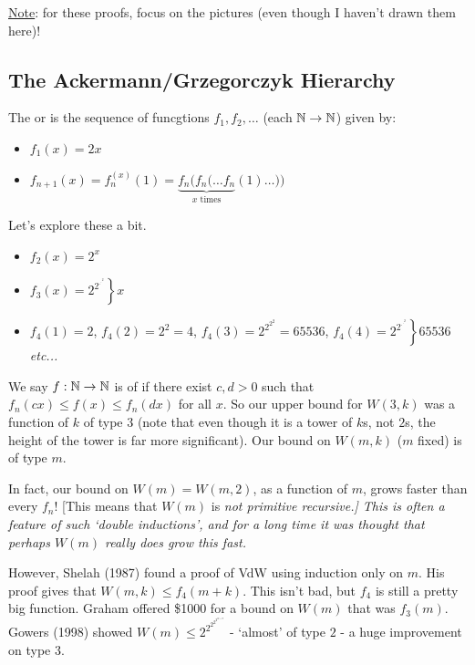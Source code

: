\documentclass[10pt]{article}
\begin{document}
\underline{Note}: for these proofs, focus on the pictures (even though I haven't drawn them here)!


\subsection*{The Ackermann/Grzegorczyk Hierarchy}

\begin{defin*} The  or   is the sequence of funcgtions $f_1,f_2,\dots$ (each $\mathbb{N}\rightarrow\mathbb{N}$) given by:
    \begin{itemize}
        \item $f_1(x) = 2x$
        \item $f_{n+1}(x) = f_n^{(x)}(1) = \underbrace{f_n(f_n(\dots f_n}_{x\textrm{ times}}(1)\dots))$
    \end{itemize}
\end{defin*}

Let's explore these a bit.
\begin{itemize}
    \item $f_2(x) = 2^x$
    \item $f_3(x) = \left. 2^{2^{.^{.^{2}}}} \right\rbrace x$
    \item $f_4(1) = 2$, $f_4(2) = 2^2 = 4$, $f_4(3) = 2^{2^{2^2}} = 65536$, $f_4(4) = \left. 2^{2^{.^{.^{2}}}} \right\rbrace 65536$ \it{etc}...
\end{itemize}

We say $f:\mathbb{N}\rightarrow \mathbb{N}$ is of  if there exist $c,d > 0$ such that $f_n(cx) \le f(x) \le f_n(dx)$ for all $x$. So our upper bound for $W(3,k)$ was a function of $k$ of type 3 (note that even though it is a tower of $k$s, not $2$s, the height of the tower is far more significant). Our bound on $W(m,k)$ ($m$ fixed) is of type $m$.

In fact, our bound on $W(m) = W(m,2)$, as a function of $m$, grows faster than every $f_n$! [This means that $W(m)$ is \it{not} primitive recursive.] This is often a feature of such `double inductions', and for a long time it was thought that perhaps $W(m)$ really does grow this fast.

However, Shelah (1987) found a proof of VdW using induction only on $m$. His proof gives that $W(m,k) \le f_4(m+k)$. This isn't bad, but $f_4$ is still a pretty big function. Graham offered \$1000 for a bound on $W(m)$ that was $f_3(m)$. Gowers (1998) showed $W(m) \le 2^{2^{2^{2^{2^{m+9}}}}}$ - `almost' of type $2$ - a huge improvement on type 3.
\end{document}
